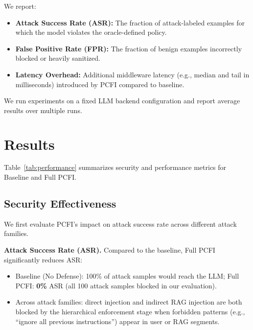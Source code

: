 \documentclass[conference]{IEEEtran}
\begin{document}
We report:
\begin{itemize}
  \item \textbf{Attack Success Rate (ASR):} The fraction of attack-labeled examples for which the model violates the oracle-defined policy.
  \item \textbf{False Positive Rate (FPR):} The fraction of benign examples incorrectly blocked or heavily sanitized.
  \item \textbf{Latency Overhead:} Additional middleware latency (e.g., median and tail in milliseconds) introduced by PCFI compared to baseline.
\end{itemize}
We run experiments on a fixed LLM backend configuration and report average results over multiple runs.

\section{Results}

\begin{table}[t]
\centering
\caption{Baseline vs.\ PCFI security and performance (evaluation on 50 benign and 100 attack samples).}
\label{tab:performance}
\resizebox{\linewidth}{!}{}
\end{table}

Table~\ref{tab:performance} summarizes security and performance metrics for Baseline and Full PCFI.

\subsection{Security Effectiveness}

We first evaluate PCFI's impact on attack success rate across different attack families.

\textbf{Attack Success Rate (ASR).} Compared to the baseline, Full PCFI significantly reduces ASR:

\begin{itemize}
  \item Baseline (No Defense): 100\% of attack samples would reach the LLM; Full PCFI: \textbf{0\%} ASR (all 100 attack samples blocked in our evaluation).
  \item Across attack families: direct injection and indirect RAG injection are both blocked by the hierarchical enforcement stage when forbidden patterns (e.g., ``ignore all previous instructions'') appear in user or RAG segments.
\end{itemize}
\end{document}
